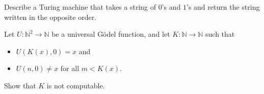 \documentclass[addpoints]{exam}
\begin{document}
  \pagestyle{headandfoot}
  \runningheadrule

  \firstpagefooter{}{}{}
  \runningfooter{}{}{}
  \begin{flushright}

    \vspace{0.2in}
  \end{flushright}

  \begin{questions}
    \question[10]
      Describe a Turing machine that takes a string of $0$'s and $1$'s and return the
			string written in the opposite order.

      \begin{solution}[\stretch{1}]
      \end{solution}
      \newpage
    \question[10]
      Let $U : \mathbb{N}^2 \to \mathbb{N}$ be a universal G\"odel function, and let
			$K : \mathbb{N} \to \mathbb{N}$ such that 
			\begin{itemize}
			  \item $U(K(x), 0) = x$ and
			  \item $U(n, 0) \neq x$ for all $m < K(x)$.
			\end{itemize}
			Show that $K$ is not computable.

      \begin{solution}[\stretch{1}]
      \end{solution}
      \newpage
  \end{questions}
\end{document}

